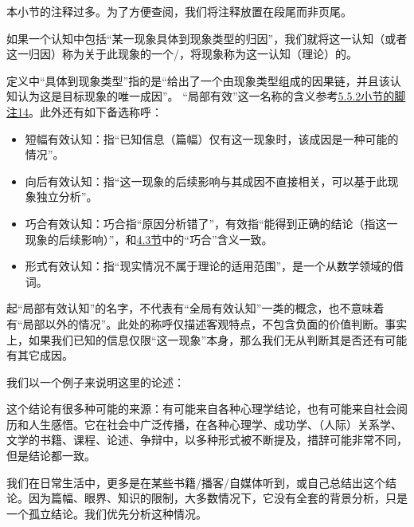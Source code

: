 \begin{explain}
本小节的注释过多。为了方便查阅，我们将注释放置在段尾而非页尾。
\end{explain}
如果一个认知中包括“某一现象具体到现象类型的归因”，我们就将这一认知（或者这一归因）称为关于此现象的一个/，将现象称为这一认知（理论）的。
\begin{explain}
定义中“具体到现象类型”指的是“给出了一个由现象类型组成的因果链，并且该认知认为这是目标现象的唯一成因”。
\insertparanotes
“局部有效”这一名称的含义参考\hyperref[footnote:局部]{5.5.2小节的脚注14}。此外还有如下备选称呼：
\begin{itemize}
\item 短幅有效认知：指“已知信息（篇幅）仅有这一现象时，该成因是一种可能的情况”。

\item 向后有效认知：指“这一现象的后续影响与其成因不直接相关，可以基于此现象独立分析”。

\item 巧合有效认知：巧合指“原因分析错了”，有效指“能得到正确的结论（指这一现象的后续影响）”，和\hyperref[sec:巧合有效的沟通]{4.3节}中的“巧合”含义一致。

\item 形式有效认知：指“现实情况不属于理论的适用范围”，是一个从数学领域的借词。
\end{itemize}
起“局部有效认知”的名字，不代表有“全局有效认知”一类的概念，也不意味着有“局部以外的情况”。此处的称呼仅描述客观特点，不包含负面的价值判断。事实上，如果我们已知的信息仅限“这一现象”本身，那么我们无从判断其是否还有可能有其它成因。
\insertparanotes
\end{explain}
我们以一个例子来说明这里的论述：
\begin{explain}
这个结论有很多种可能的来源：有可能来自各种心理学结论，也有可能来自社会阅历和人生感悟。它在社会中广泛传播，在各种心理学、成功学、（人际）关系学、文学的书籍、课程、论述、争辩中，以多种形式被不断提及，措辞可能非常不同，但是结论都一致。

我们在日常生活中，更多是在某些书籍/播客/自媒体听到，或自己总结出这个结论。因为篇幅、眼界、知识的限制，大多数情况下，它没有全套的背景分析，只是一个孤立结论。我们优先分析这种情况。
\end{explain}
